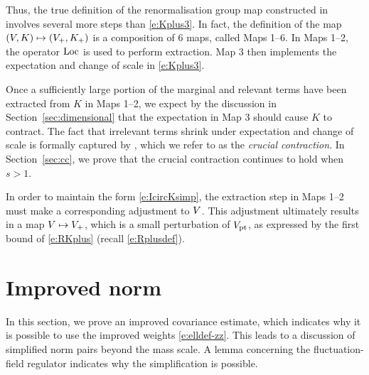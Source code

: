 Thus, the true definition of the renormalisation group map constructed in
\cite{BS-rg-step} involves several more steps than \eqref{e:Kplus3}. In fact,
the definition of the map $(V, K) \mapsto (V_+, K_+)$ is a composition of
$6$ maps, called Maps 1--6. In Maps 1--2, the operator $\operatorname{Loc}$ is used to perform
extraction. Map 3 then implements the expectation and change of scale in
\eqref{e:Kplus3}.

Once a sufficiently large portion of the marginal and relevant terms have been
extracted from $K$ in Maps 1--2, we expect by the discussion in Section~\ref{sec:dimensional}
that the expectation in Map 3 should cause $K$ to contract. The fact that irrelevant
terms shrink under expectation and change of scale is formally captured by
\cite[Proposition~\ref{IE-prop:cl}]{BS-rg-IE}, which we refer to as the
\emph{crucial contraction}. In Section~\ref{sec:cc}, we prove that the
crucial contraction continues to hold when $s > 1$.

\begin{rk}
In order to maintain the form \eqref{e:IcircKsimp}, the extraction step in Maps 1--2
must make a corresponding adjustment to $V$. This adjustment ultimately results in a
map $V \mapsto V_+$, which is a small perturbation of $V_{\rm pt}$, as expressed
by the first bound of \eqref{e:RKplus} (recall \eqref{e:Rplusdef}).
\end{rk}


\section{Improved norm}
\label{sec:Rpf1}

In this section, we prove an improved covariance estimate, which indicates why
it is possible to use the improved weights \eqref{e:elldef-zz}. This leads to a
discussion of simplified norm pairs beyond the mass scale. A lemma concerning the
fluctuation-field regulator indicates why the simplification is possible.

